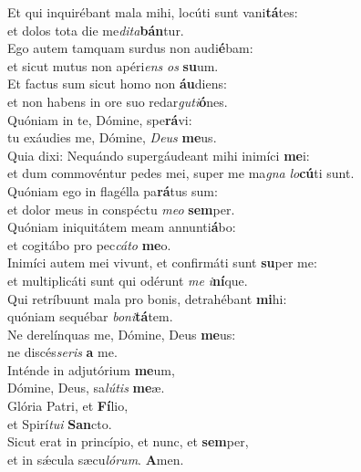 \oddverse Et qui inquirébant mala mihi, locúti sunt vani\textbf{tá}tes:~\*\\
\oddverse et dolos tota die me\textit{di}\textit{ta}\textbf{bán}tur.\\
\evenverse Ego autem tamquam surdus non audi\textbf{é}bam:~\*\\
\evenverse et sicut mutus non apéri\textit{ens} \textit{os} \textbf{su}um.\\
\oddverse Et factus sum sicut homo non \textbf{áu}diens:~\*\\
\oddverse et non habens in ore suo redar\textit{gu}\textit{ti}\textbf{ó}nes.\\
\evenverse Quóniam in te, Dómine, spe\textbf{rá}vi:~\*\\
\evenverse tu exáudies me, Dómine, \textit{De}\textit{us} \textbf{me}us.\\
\oddverse Quia dixi: Nequándo supergáudeant mihi inimíci \textbf{me}i:~\*\\
\oddverse et dum commovéntur pedes mei, super me ma\textit{gna} \textit{lo}\textbf{cú}ti sunt.\\
\evenverse Quóniam ego in flagélla pa\textbf{rá}tus sum:~\*\\
\evenverse et dolor meus in conspéctu \textit{me}\textit{o} \textbf{sem}per.\\
\oddverse Quóniam iniquitátem meam annunti\textbf{á}bo:~\*\\
\oddverse et cogitábo pro pec\textit{cá}\textit{to} \textbf{me}o.\\
\evenverse Inimíci autem mei vivunt, et confirmáti sunt \textbf{su}per me:~\*\\
\evenverse et multiplicáti sunt qui odérunt \textit{me} \textit{i}\textbf{ní}que.\\
\oddverse Qui retríbuunt mala pro bonis, detrahébant \textbf{mi}hi:~\*\\
\oddverse quóniam sequébar \textit{bo}\textit{ni}\textbf{tá}tem.\\
\evenverse Ne derelínquas me, Dómine, Deus \textbf{me}us:~\*\\
\evenverse ne discés\textit{se}\textit{ris} \textbf{a} me.\\
\oddverse Inténde in adjutórium \textbf{me}um,~\*\\
\oddverse Dómine, Deus, sa\textit{lú}\textit{tis} \textbf{me}æ.\\
\evenverse Glória Patri, et \textbf{Fí}lio,~\*\\
\evenverse et Spirí\textit{tu}\textit{i} \textbf{San}cto.\\
\oddverse Sicut erat in princípio, et nunc, et \textbf{sem}per,~\*\\
\oddverse et in sǽcula sæcu\textit{ló}\textit{rum}. \textbf{A}men.\\
